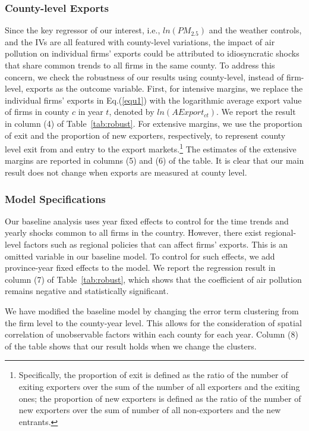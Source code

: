 \documentclass[12pt]{article}
\begin{document}
\subsubsection{County-level Exports}
Since the key regressor of our interest,  i.e., $ln(PM_{2.5})$ and the weather
controls, and the IVs are all featured with county-level
variations, the impact of air pollution on individual firms' exports could
be attributed to idiosyncratic shocks that share common trends to all firms
in the same county. To address this concern, we check the robustness of our
results using county-level, instead of firm-level, exports as the outcome
variable. First, for intensive margins, we
replace the individual firms' exports in Eq.(\ref{equ1}) with the
logarithmic average export value of firms in county $c$ in year $t$, denoted
by $ln(AExport_{ct})$. We report the result in column (4) of Table~\ref{tab:robust}. For extensive margins, we use 
the proportion of exit and the proportion of new exporters, respectively, to represent county level exit from and entry to the export markets.\footnote{Specifically, the proportion of exit is defined as 
the ratio of the number of
exiting exporters over the sum of the number of all exporters and the exiting
ones; the proportion of new exporters is defined as 
the ratio of the number of new exporters over the sum of number of all non-exporters and the new entrants.} The estimates of
the extensive margins are reported in columns (5) and (6) of the table. It
is clear that our main result does not change when exports are measured at
county level. 

\subsubsection{Model Specifications}
Our baseline analysis uses year fixed effects to control for the time trends
and yearly shocks common to all firms in the country. However, there
exist regional-level factors such as regional policies that can affect
firms' exports. This is an omitted variable in our baseline model. To
control for such effects, we add province-year fixed effects to the model.
We report the regression result in column (7) of Table~\ref{tab:robust},
which shows that the coefficient of air pollution remains negative and statistically
significant.

We have modified the baseline model by changing the error term clustering from the firm level to the county-year level. This allows for the consideration of spatial correlation of unobservable factors within each county for each year. Column (8) of the table shows that our result holds when we change the clusters.
\end{document}
